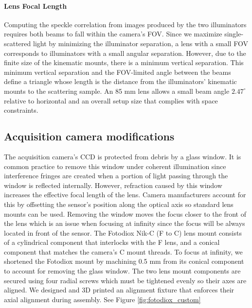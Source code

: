 \paragraph{Lens Focal Length} Computing the speckle correlation from images produced by the two illuminators requires both beams to fall within the camera's FOV. Since we maximize single-scattered light by minimizing the illuminator separation, a lens with a small FOV corresponds to illuminators with a small angular separation. However, due to the finite size of the kinematic mounts, there is a minimum vertical separation. This minimum vertical separation and the FOV-limited angle between the beams define a triangle whose length is the distance from the illuminators' kinematic mounts to the scattering sample. An 85 mm lens allows a small beam angle $2.47^\circ$ relative to horizontal and an overall setup size that complies with space constraints.

\subsection{Acquisition camera modifications}
The acquisition camera's CCD is protected from debris by a glass window. It is common practice to remove this window under coherent illumination since interference fringes are created when a portion of light passing through the window is reflected internally. However, refraction caused by this window increases the effective focal length of the lens. Camera manufacturers account for this by offsetting the sensor's position along the optical axis so standard lens mounts can be used. Removing the window moves the focus closer to the front of the lens which is an issue when focusing at infinity since the focus will be always located in front of the sensor. The Fotodiox Nik-C (F to C) lens mount consists of a cylindrical component that interlocks with the F lens, and a conical component that matches the camera's C mount threads. To focus at infinity, we shortened the Fotodiox mount by machining 0.5 mm from its conical component to account for removing the glass window. The two lens mount components are secured using four radial screws which must be tightened evenly so their axes are aligned. We designed and 3D printed an alignment fixture that enforces their axial alignment during assembly. See Figure \ref{fig:fotodiox_custom}

